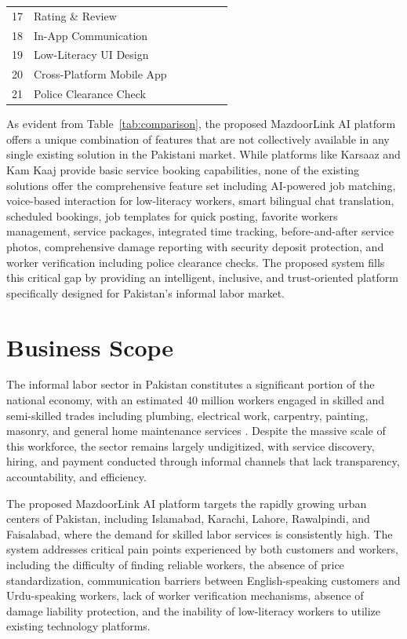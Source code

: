 \documentclass[12pt,a4paper]{report}
\newcommand{\cmark}{\ding{51}}
\newcommand{\xmark}{\ding{55}}
\begin{document}
\begin{table}[h]
{\begin{tabular}{clccccc}
        17 & Rating \& Review             & \cmark & \cmark & \xmark & \cmark & \cmark \\
        18 & In-App Communication         & \cmark & \xmark & \xmark & \cmark & \cmark \\
        19 & Low-Literacy UI Design       & \xmark & \xmark & \xmark & \xmark & \cmark \\
        20 & Cross-Platform Mobile App    & \cmark & \cmark & \xmark & \cmark & \cmark \\
        21 & Police Clearance Check       & \xmark & \xmark & \xmark & \xmark & \cmark \\
        \bottomrule
    \end{tabular}}
\end{table}

As evident from Table~\ref{tab:comparison}, the proposed MazdoorLink AI platform
offers a unique combination of features that are not collectively available in
any single existing solution in the Pakistani market. While platforms like
Karsaaz and Kam Kaaj provide basic service booking capabilities, none of the
existing solutions offer the comprehensive feature set including AI-powered job
matching, voice-based interaction for low-literacy workers, smart bilingual chat
translation, scheduled bookings, job templates for quick posting, favorite
workers management, service packages, integrated time tracking, before-and-after
service photos, comprehensive damage reporting with security deposit protection,
and worker verification including police clearance checks. The proposed system
fills this critical gap by providing an intelligent, inclusive, and
trust-oriented platform specifically designed for Pakistan's informal labor
market.

\section{Business Scope}

The informal labor sector in Pakistan constitutes a significant portion of the
national economy, with an estimated 40 million workers engaged in skilled and
semi-skilled trades including plumbing, electrical work, carpentry, painting,
masonry, and general home maintenance services \cite{pbs}. Despite the massive
scale of this workforce, the sector remains largely undigitized, with service
discovery, hiring, and payment conducted through informal channels that lack
transparency, accountability, and efficiency.

The proposed MazdoorLink AI platform targets the rapidly growing urban centers
of Pakistan, including Islamabad, Karachi, Lahore, Rawalpindi, and Faisalabad,
where the demand for skilled labor services is consistently high. The system
addresses critical pain points experienced by both customers and workers,
including the difficulty of finding reliable workers, the absence of price
standardization, communication barriers between English-speaking customers and
Urdu-speaking workers, lack of worker verification mechanisms, absence of damage
liability protection, and the inability of low-literacy workers to utilize
existing technology platforms.
\end{document}
